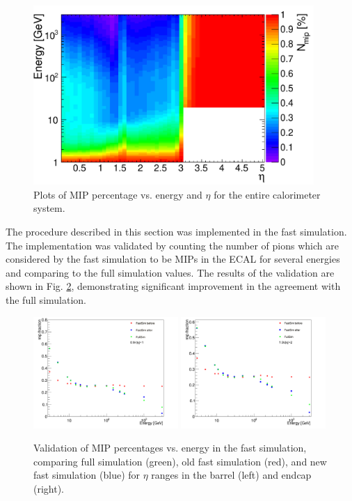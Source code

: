 \begin{figure}[hbtp]
\begin{center}
\includegraphics[width=0.95\textwidth]{figures/all_mip_interp.pdf}
\caption{Plots of MIP percentage vs. energy and $\eta$ for the entire calorimeter system.}
\label{fig:allmippct}
\end{center}
\end{figure}

The procedure described in this section was implemented in the fast simulation. The implementation was validated by counting the number of pions which are considered by the fast simulation to be MIPs in the ECAL for several energies and comparing to the full simulation values. The results of the validation are shown in Fig. \ref{fig:mipvalidate}, demonstrating significant improvement in the agreement with the full simulation.

\begin{figure}[hbtp]
\begin{center}
\includegraphics[width=0.49\textwidth]{figures/final_mip_validate_ieta10.png}
\includegraphics[width=0.49\textwidth]{figures/final_mip_validate_ieta20.png}
\caption{Validation of MIP percentages vs. energy in the fast simulation, comparing full simulation (green), old fast simulation (red), and new fast simulation (blue) for $\eta$ ranges in the barrel (left) and endcap (right).}
\label{fig:mipvalidate}
\end{center}
\end{figure}

